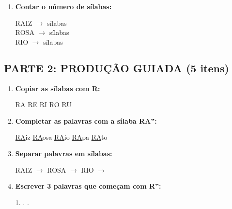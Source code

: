 \begin{exercicio}
\begin{enumerate}
  \item \textbf{Contar o número de sílabas:}
  \begin{center}
  RAIZ $\rightarrow$ \underline{\hspace{1cm}} sílabas \\
  ROSA $\rightarrow$ \underline{\hspace{1cm}} sílabas \\
  RIO $\rightarrow$ \underline{\hspace{1cm}} sílabas
  \end{center}
\end{enumerate}

\subsection*{PARTE 2: PRODUÇÃO GUIADA (5 itens)}

\begin{enumerate}[resume]
  \item \textbf{Copiar as sílabas com R:}
  \begin{center}
  RA \quad \underline{\hspace{1.5cm}} \quad RE \quad \underline{\hspace{1.5cm}} \quad RI \quad \underline{\hspace{1.5cm}} \quad RO \quad \underline{\hspace{1.5cm}} \quad RU \quad \underline{\hspace{1.5cm}}
  \end{center}

  \item \textbf{Completar as palavras com a sílaba RA'':}
  \begin{center}
  \underline{RA}iz \quad \underline{RA}osa \quad \underline{RA}io \quad \underline{RA}pa \quad \underline{RA}to
  \end{center}

  \item \textbf{Separar palavras em sílabas:}
  \begin{center}
  RAIZ $\rightarrow$ \underline{\hspace{1.5cm}} \quad ROSA $\rightarrow$ \underline{\hspace{1.5cm}} \quad RIO $\rightarrow$ \underline{\hspace{1.5cm}}
  \end{center}

  \item \textbf{Escrever 3 palavras que começam com R'':}
  \begin{center}
  1. \underline{\hspace{3cm}} . \underline{\hspace{3cm}} . \underline{\hspace{3cm}}
  \end{center}


\end{enumerate}
\end{exercicio}
